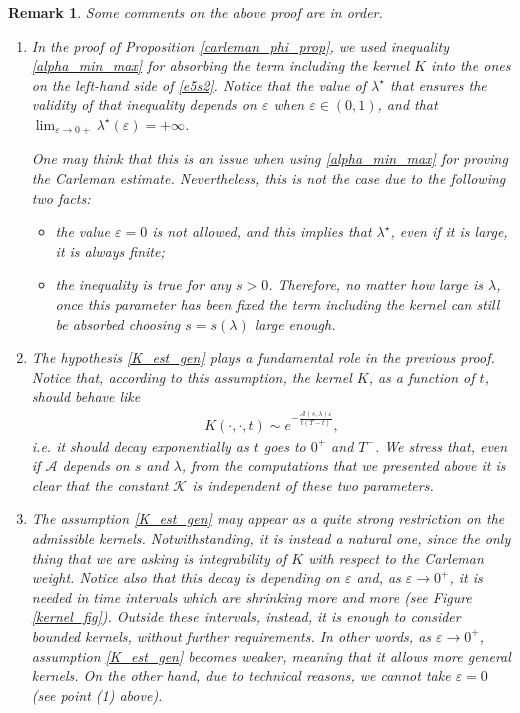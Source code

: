 \documentclass[preprint,1p]{elsarticle}
\newtheorem{remark}{\bf Remark}[section]
\begin{document}
\begin{remark}\label{rem_lambda}
%	
Some comments on the above proof are in order. 	
%
\begin{enumerate}
	\item In the proof of Proposition \ref{carleman_phi_prop}, we used inequality \eqref{alpha_min_max} for absorbing the term including the kernel $K$ into the ones on the left-hand side of \eqref{e5s2}. Notice that the value of $\lambda^\star$ that ensures the validity of that inequality depends on $\varepsilon$ when $\varepsilon\in(0,1)$, and that ${\lim_{\varepsilon\to 0+}\lambda^\star(\varepsilon)=+\infty}$. 
	
	One may think that this is an issue when using \eqref{alpha_min_max} for proving the Carleman estimate. Nevertheless, this is not the case due to the following two facts:
	\begin{itemize}
		\item the value $\varepsilon=0$ is not allowed, and this implies that $\lambda^\star$, even if it is large, it is always finite;
		\item the inequality is true for any $s>0$. Therefore, no matter how large is $\lambda$, once this parameter has been fixed the term including the kernel can still be absorbed choosing $s=s(\lambda)$ large enough. 
	\end{itemize}
	
	\item The hypothesis \eqref{K_est_gen} plays a fundamental role in the previous proof. Notice that, according to this assumption, the kernel $K$, as a function of $t$, should behave like 
	\begin{align*}
		K(\cdot,\cdot,t)\sim e^{-\frac{\mathcal{A}(s,\lambda)\varepsilon}{t(T-t)}},
	\end{align*}
	i.e. it should decay exponentially as $t$ goes to $0^+$ and $T^-$. We stress that, even if $\mathcal{A}$ depends on $s$ and $\lambda$, from the computations that we presented above it is clear that the constant $\mathcal{K}$ is independent of these two parameters.
	
	\item  The assumption \eqref{K_est_gen} may appear as a quite strong restriction on the admissible kernels. Notwithstanding, it is instead a natural one, since the only thing that we are asking is integrability of $K$ with respect to the Carleman weight. Notice also that this decay is depending on $\varepsilon$ and, as $\varepsilon\to 0^+$, it is needed in time intervals which are shrinking more and more (see Figure \ref{kernel_fig}). Outside these intervals, instead, it is enough to consider bounded kernels, without further requirements. In other words, as $\varepsilon\to 0^+$, assumption \eqref{K_est_gen} becomes weaker, meaning that it allows more general kernels. On the other hand, due to technical reasons, we cannot take $\varepsilon=0$ (see point (1) above). 
	

\end{enumerate}
\end{remark}
\end{document}
